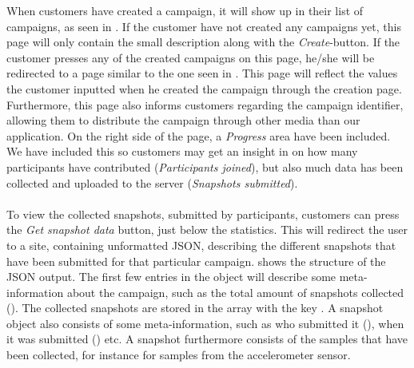 When customers have created a campaign, it will show up in their list of campaigns, as seen in . If the customer have not created any campaigns yet, this page will only contain the small description along with the \emph{Create}-button. If the customer presses any of the created campaigns on this page, he/she will be redirected to a page similar to the one seen in . This page will reflect the values the customer inputted when he created the campaign through the creation page. Furthermore, this page also informs customers regarding the campaign identifier, allowing them to distribute the campaign through other media than our application. On the right side of the page, a \emph{Progress} area have been included. We have included this so customers may get an insight in on how many participants have contributed (\emph{Participants joined}), but also much data has been collected and uploaded to the server (\emph{Snapshots submitted}). 
\\\\
To view the collected snapshots, submitted by participants, customers can press the \emph{Get snapshot data} button, just below the statistics. This will redirect the user to a site, containing unformatted JSON, describing the different snapshots that have been submitted for that particular campaign.  shows the structure of the JSON output. The first few entries in the object will describe some meta-information about the campaign, such as the total amount of snapshots collected (). The collected snapshots are stored in the array with the key . A snapshot object also consists of some meta-information, such as who submitted it (), when it was submitted () etc. A snapshot furthermore consists of the samples that have been collected, for instance  for samples from the accelerometer sensor.


\FloatBarrier


